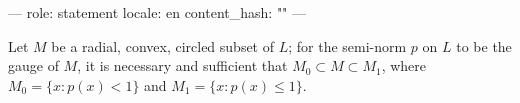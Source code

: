 ---
role: statement
locale: en
content_hash: ""
---

Let $M$ be a radial, convex, circled subset of $L$; for the semi-norm $p$ on $L$ to be the gauge of $M$, it is necessary and sufficient that $M_0 \subset M \subset M_1$, where $M_0 = \{x : p(x) < 1\}$ and $M_1 = \{x : p(x) \leq 1\}$.
